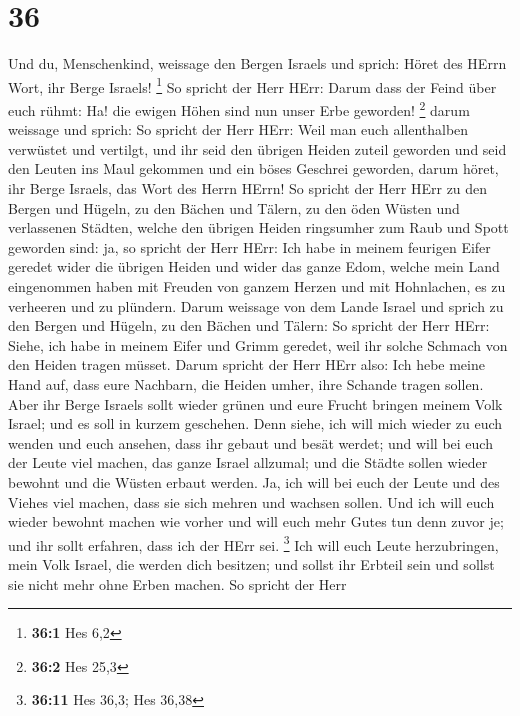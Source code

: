 \hypertarget{section-35}{%
\section{36}\label{section-35}}

 Und du, Menschenkind, weissage den Bergen Israels und
sprich: Höret des HErrn Wort, ihr Berge Israels! \footnote{\textbf{36:1}
  Hes 6,2}  So spricht der Herr HErr: Darum dass der Feind
über euch rühmt: Ha! die ewigen Höhen sind nun unser Erbe geworden!
\footnote{\textbf{36:2} Hes 25,3}  darum weissage und
sprich: So spricht der Herr HErr: Weil man euch allenthalben verwüstet
und vertilgt, und ihr seid den übrigen Heiden zuteil geworden und seid
den Leuten ins Maul gekommen und ein böses Geschrei geworden,
 darum höret, ihr Berge Israels, das Wort des Herrn HErrn!
So spricht der Herr HErr zu den Bergen und Hügeln, zu den Bächen und
Tälern, zu den öden Wüsten und verlassenen Städten, welche den übrigen
Heiden ringsumher zum Raub und Spott geworden sind:  ja,
so spricht der Herr HErr: Ich habe in meinem feurigen Eifer geredet
wider die übrigen Heiden und wider das ganze Edom, welche mein Land
eingenommen haben mit Freuden von ganzem Herzen und mit Hohnlachen, es
zu verheeren und zu plündern.  Darum weissage von dem
Lande Israel und sprich zu den Bergen und Hügeln, zu den Bächen und
Tälern: So spricht der Herr HErr: Siehe, ich habe in meinem Eifer und
Grimm geredet, weil ihr solche Schmach von den Heiden tragen müsset.
 Darum spricht der Herr HErr also: Ich hebe meine Hand
auf, dass eure Nachbarn, die Heiden umher, ihre Schande tragen sollen.
 Aber ihr Berge Israels sollt wieder grünen und eure
Frucht bringen meinem Volk Israel; und es soll in kurzem geschehen.
 Denn siehe, ich will mich wieder zu euch wenden und euch
ansehen, dass ihr gebaut und besät werdet;  und will bei
euch der Leute viel machen, das ganze Israel allzumal; und die Städte
sollen wieder bewohnt und die Wüsten erbaut werden.  Ja,
ich will bei euch der Leute und des Viehes viel machen, dass sie sich
mehren und wachsen sollen. Und ich will euch wieder bewohnt machen wie
vorher und will euch mehr Gutes tun denn zuvor je; und ihr sollt
erfahren, dass ich der HErr sei. \footnote{\textbf{36:11} Hes 36,3; Hes
  36,38}  Ich will euch Leute herzubringen, mein Volk
Israel, die werden dich besitzen; und sollst ihr Erbteil sein und sollst
sie nicht mehr ohne Erben machen.  So spricht der Herr
